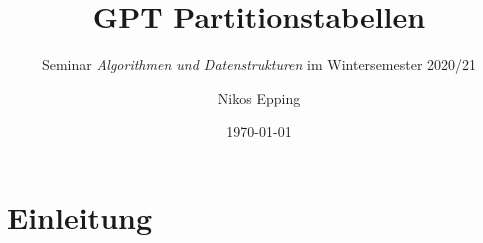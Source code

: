 \documentclass[12pt,ngerman,a4paper,parskip]{scrartcl}
\title{GPT Partitionstabellen}
\subtitle{Seminar \textit{Algorithmen und Datenstrukturen} im Wintersemester 2020/21}
\author{Nikos Epping}
\date{\today}
\begin{document}

\maketitle

\newpage

\tableofcontents

\newpage


\section{Einleitung}
\end{document}
